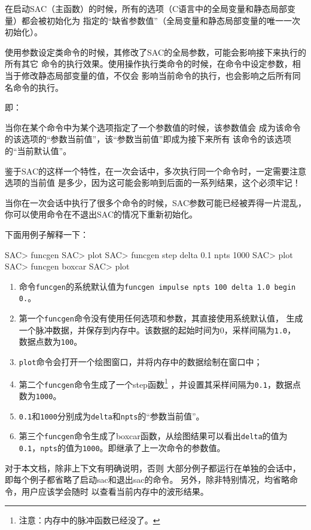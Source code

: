在启动SAC（主函数）的时候，所有的选项（C语言中的全局变量和静态局部变量）都会被初始化为
指定的``缺省参数值''（全局变量和静态局部变量的唯一一次初始化）。

使用参数设定类命令的时候，其修改了SAC的全局参数，可能会影响接下来执行的所有其它
命令的执行效果。使用操作执行类命令的时候，在命令中设定参数，相当于修改静态局部变量的值，不仅会
影响当前命令的执行，也会影响之后所有同名命令的执行。

即：

当你在某个命令中为某个选项指定了一个参数值的时候，该参数值会
成为该命令的该选项的``参数当前值''，该``参数当前值''即成为接下来所有
该命令的该选项的``当前默认值''。

鉴于SAC的这样一个特性，在一次会话中，多次执行同一个命令时，一定需要注意选项的当前值
是多少，因为这可能会影响到后面的一系列结果，这个必须牢记！

当你在一次会话中执行了很多个命令的时候，SAC参数可能已经被弄得一片混乱，
你可以使用命令在不退出SAC的情况下重新初始化。

下面用例子解释一下：
\begin{SACCode}
SAC> funcgen
SAC> plot
SAC> funcgen step delta 0.1 npts 1000
SAC> plot
SAC> funcgen boxcar
SAC> plot
\end{SACCode}

\begin{enumerate}
\item 命令\lstinline{funcgen}的系统默认值为\lstinline{funcgen impulse npts 100 delta 1.0 begin 0.}。
\item 第一个\lstinline{funcgen}命令没有使用任何选项和参数，其直接使用系统默认值，
    生成一个脉冲数据，并保存到内存中。该数据的起始时间为0，采样间隔为\lstinline{1.0}，
    数据点数为\lstinline{100}。
\item \lstinline{plot}命令会打开一个绘图窗口，并将内存中的数据绘制在窗口中；
\item 第二个\lstinline{funcgen}命令生成了一个step函数\footnote{注意：内存中的脉冲函数已经没了。}
    ，并设置其采样间隔为\lstinline{0.1}，数据点数为\lstinline{1000}。
\item \lstinline{0.1}和\lstinline{1000}分别成为\lstinline{delta}和\lstinline{npts}的``参数当前值''。
\item 第三个\lstinline{funcgen}命令生成了boxcar函数，从绘图结果可以看出\lstinline{delta}的值为
    \lstinline{0.1}，\lstinline{npts}的值为\lstinline{1000}。即继承了上一次命令的参数值。
\end{enumerate}

对于本文档，除非上下文有明确说明，否则
大部分例子都运行在单独的会话中，即每个例子都省略了启动sac和退出sac的命令。
另外，除非特别情况，均省略命令，用户应该学会随时
以查看当前内存中的波形结果。
